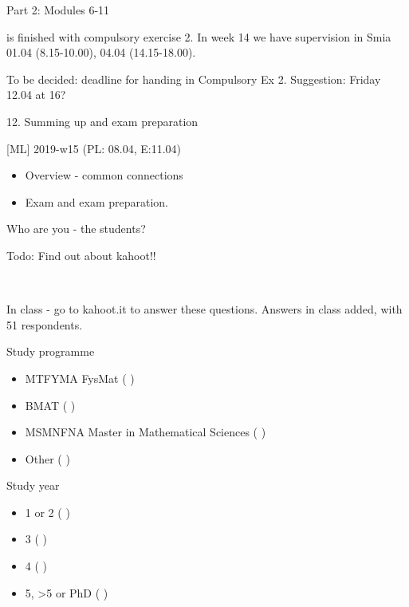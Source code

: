 \documentclass[10pt,ignorenonframetext,]{beamer}
\providecommand{\tightlist}{%
  \setlength{\itemsep}{0pt}\setlength{\parskip}{0pt}}
\begin{document}
\begin{frame}

\begin{block}{Part 2: Modules 6-11}

is finished with compulsory exercise 2. In week 14 we have supervision
in Smia 01.04 (8.15-10.00), 04.04 (14.15-18.00).

To be decided: deadline for handing in Compulsory Ex 2. Suggestion:
Friday 12.04 at 16?

\end{block}

\begin{block}{12. Summing up and exam preparation}

{[}ML{]} 2019-w15 (PL: 08.04, E:11.04)

\begin{itemize}
\tightlist
\item
  Overview - common connections
\item
  Exam and exam preparation.
\end{itemize}

\end{block}

\end{frame}

\begin{frame}{Who are you - the students?}

Todo: Find out about kahoot!!

~

In class - go to kahoot.it to answer these questions. Answers in class
added, with 51 respondents.

\begin{block}{Study programme}

\begin{itemize}
\tightlist
\item
  MTFYMA FysMat ( )
\item
  BMAT ( )
\item
  MSMNFNA Master in Mathematical Sciences ( )
\item
  Other ( )
\end{itemize}

\end{block}

\begin{block}{Study year}

\begin{itemize}
\tightlist
\item
  1 or 2 ( )
\item
  3 ( )
\item
  4 ( )
\item
  5, \textgreater{}5 or PhD ( )
\end{itemize}

\end{block}

\end{frame}
\end{document}
